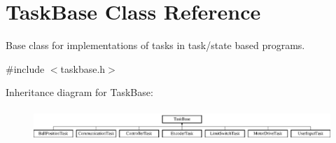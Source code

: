 \hypertarget{class_task_base}{}\section{Task\+Base Class Reference}
\label{class_task_base}


Base class for implementations of tasks in task/state based programs.  




{\ttfamily \#include $<$taskbase.\+h$>$}

Inheritance diagram for Task\+Base\+:\begin{figure}[H]
\begin{center}
\leavevmode
\includegraphics[height=1.221374cm]{class_task_base}
\end{center}
\end{figure}
